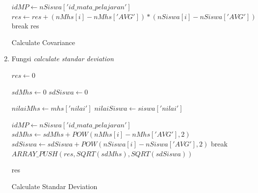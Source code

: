 \begin{enumerate}
\begin{algorithm}[H]
\begin{algorithmic}[1]
                        \State $idMP \gets nSiswa['id\_mata\_pelajaran']$
                                    \State $res \gets res +  (nMhs[i]-nMhs['AVG'])*(nSiswa[i]-nSiswa['AVG'])$
                                \EndFor
                                \State break
                            \EndIf
                        \EndFor
                    \EndFor
                    \State \Return res
                \EndProcedure
            \end{algorithmic} 
            \caption{Calculate Covariance}
            \label{alg:calculateCovariance}
        \end{algorithm}
        
    \item Fungsi \textit{calculate standar deviation}\\
        
        \begin{algorithm}[H]
            \begin{algorithmic}[1]
                    \State $res \gets 0$
                    
                    \State $sdMhs \gets 0$
                    \State $sdSiswa \gets 0$
                    
                    \State $nilaiMhs \gets mhs['nilai']$
                    \State $nilaiSiswa \gets siswa['nilai']$
                    
                        \State $idMP \gets nSiswa['id\_mata\_pelajaran']$
                                    \State $sdMhs \gets sdMhs + POW(nMhs[i]-nMhs['AVG'],2)$
                                    \State $sdSiswa \gets sdSiswa + POW(nSiswa[i]-nSiswa['AVG'],2)$
                                \EndFor
                                \State break
                            \EndIf
                        \EndFor
                    \EndFor
                    \State $ARRAY\_PUSH(res, SQRT(sdMhs), SQRT(sdSiswa))$
                    
                    \State \Return res
                \EndProcedure
            \end{algorithmic} 
            \caption{Calculate Standar Deviation}
            \label{alg:calculateStandarDeviation pearson}
        \end{algorithm}
\end{enumerate}

